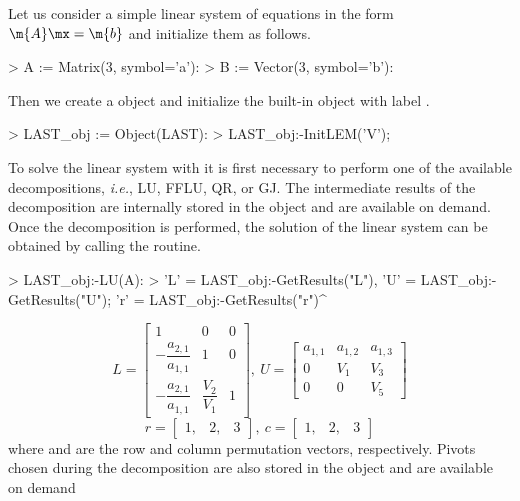 \begin{example}
  Let us consider a simple linear system of equations in the form $\m{A}\mx = \m{b}$ and initialize them as follows.
  \begin{mapleinline}
> A := Matrix(3, symbol='a'):
> B := Vector(3, symbol='b'):
  \end{mapleinline}
  Then we create a \LAST{} object and initialize the built-in \LEM{} object with label .
  \begin{mapleinline}
> LAST_obj := Object(LAST):
> LAST_obj:-InitLEM('V');
  \end{mapleinline}
  To solve the linear system with \LAST{} it is first necessary to perform one of the available decompositions, \emph{i.e.}, \ac{LU}, \ac{FFLU}, QR, or \ac{GJ}. The intermediate results of the decomposition are internally stored in the \LAST{} object and are available on demand. Once the decomposition is performed, the solution of the linear system can be obtained by calling the  routine.
  \begin{mapleinline}
> LAST_obj:-LU(A):
> 'L' = LAST_obj:-GetResults("L"),    'U' = LAST_obj:-GetResults("U");
  'r' = LAST_obj:-GetResults("r")^%
  \end{mapleinline}
  \begin{equation*}
    L = \begin{bmatrix}
      1 & 0 & 0 \\
      -\dfrac{a_{2,1}}{a_{1,1}} & 1 & 0 \\
      -\dfrac{a_{2,1}}{a_{1,1}} & \dfrac{V_{2}}{V_{1}} & 1
    \end{bmatrix}, ~
    U = \begin{bmatrix}
      a_{1,1} & a_{1,2} & a_{1,3} \\
      0 & V_{1} & V_{3} \\
      0 & 0 & V_{5}
    \end{bmatrix}
  \end{equation*}
  \begin{equation*}
    r = \begin{bmatrix}
      1, & 2, & 3
    \end{bmatrix}, ~
    c = \begin{bmatrix}
      1, & 2, & 3
    \end{bmatrix}
  \end{equation*}
  where  and  are the row and column permutation vectors, respectively. Pivots chosen during the decomposition are also stored in the \LAST{} object and are available on demand

\end{example}

